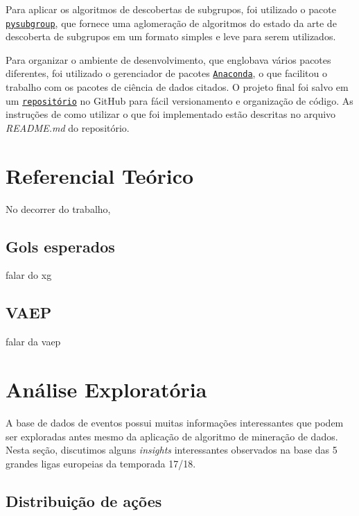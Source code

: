 \documentclass{article}
\begin{document}
Para aplicar os algoritmos de descobertas de subgrupos, foi utilizado o pacote
\href{https://pysubgroup.readthedocs.io/en/latest/}{\texttt{pysubgroup}}, que
fornece uma aglomeração de algoritmos do estado da arte de descoberta de
subgrupos em um formato simples e leve para serem utilizados.


Para organizar o ambiente de desenvolvimento, que englobava vários pacotes
diferentes, foi utilizado o gerenciador de pacotes
\href{https://www.anaconda.com/}{\texttt{Anaconda}}, o que facilitou o trabalho
com os pacotes de ciência de dados citados. O projeto final foi salvo em um
\href{https://github.com/lframosferreira/projeto-ad}{\texttt{repositório}}
no GitHub para fácil versionamento e organização de código. As instruções de
como
utilizar o que foi implementado estão descritas no arquivo \textit{README.md}
do repositório.

\section{Referencial Teórico}

No decorrer do trabalho, 

\subsection{Gols esperados}

falar do xg

\subsection{VAEP}

falar da vaep \cite{vaep}

\section{Análise Exploratória}

A base de dados de eventos possui muitas informações interessantes que podem
ser exploradas antes mesmo da aplicação
de algoritmo de mineração de dados. Nesta seção, discutimos alguns
\textit{insights} interessantes observados na base das 5 grandes ligas
europeias da temporada 17/18.

\subsection{Distribuição de ações}
\end{document}
